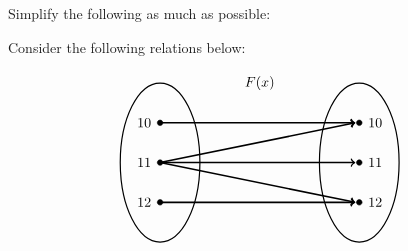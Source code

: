 \documentclass[12pt,letterpaper]{exam}
\begin{document}
\begin{questions}



\newpage



\question[6] Simplify the following as much as possible: \pspace
{}



\newpage



\question[6] Consider the following relations below:

	\[
	\begin{tikzpicture}
	\node at (2.5,2) {$F(x)$};
	
	\draw[line width=0.03cm] (0,0) circle (1 and 2);
	\draw[line width=0.03cm] (5,0) circle (1 and 2);
	
	\draw[fill=black] (0,1) circle (0.07);
	\draw[fill=black] (0,0) circle (0.07);
	\draw[fill=black] (0,-1) circle (0.07);
	
	\draw[fill=black] (5,1) circle (0.07);
	\draw[fill=black] (5,0) circle (0.07);
	\draw[fill=black] (5,-1) circle (0.07);
	
	\draw[line width=0.04cm,->] (0,1) -- (4.9,1);
	\draw[line width=0.04cm,->] (0,0) -- (4.9,1);
	\draw[line width=0.04cm,->] (0,0) -- (4.9,0);
	\draw[line width=0.04cm,->] (0,0) -- (4.9,-1);
	\draw[line width=0.04cm,->] (0,-1) -- (4.9,-1);
	
	\node at (-0.4,1) {$10$};
	\node at (-0.4,0) {$11$};
	\node at (-0.4,-1) {$12$};
	
	\node at (5.4,1) {$10$};
	\node at (5.4,0) {$11$};
	\node at (5.4,-1) {$12$};
	

\end{tikzpicture}\]
\end{questions}
\end{document}
